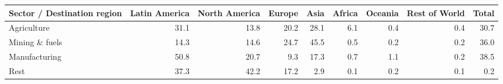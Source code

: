 \begin{tabular}{lrrrrrrrr}
\toprule
Sector / Destination region & Latin America & North America & Europe & Asia & Africa & Oceania & Rest of World & Total \\
\midrule
Agriculture & 31.1 & 13.8 & 20.2 & 28.1 & 6.1 & 0.4 & 0.4 & 30.7 \\
Mining \& fuels & 14.3 & 14.6 & 24.7 & 45.5 & 0.5 & 0.2 & 0.2 & 36.0 \\
Manufacturing & 50.8 & 20.7 & 9.3 & 17.3 & 0.7 & 1.1 & 0.2 & 38.5 \\
Rest & 37.3 & 42.2 & 17.2 & 2.9 & 0.1 & 0.2 & 0.1 & 0.2 \\
\bottomrule
\end{tabular}
